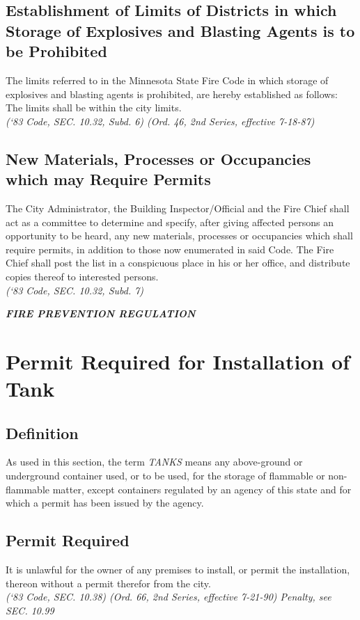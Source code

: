 \subsection{Establishment of Limits of Districts in which Storage of Explosives and Blasting Agents is to be Prohibited}
The limits referred to in the Minnesota State Fire Code in which storage of explosives and blasting agents is prohibited, are hereby established as follows: The limits shall be within the city limits.\\
\emph{(‘83 Code, SEC. 10.32, Subd. 6)  (Ord. 46, 2nd Series, effective 7-18-87)}
\subsection{New Materials, Processes or Occupancies which may Require Permits}
The City Administrator, the Building Inspector/Official and the Fire Chief shall act as a committee to determine and specify, after giving affected persons an opportunity to be heard, any new materials, processes or occupancies which shall require permits, in addition to those now enumerated in said Code. The Fire Chief shall post the list in a conspicuous place in his or her office, and distribute copies thereof to interested persons.\\
\emph{(‘83 Code, SEC. 10.32, Subd. 7)}

\begin{center}
\emph{\textbf{\LARGE{FIRE PREVENTION REGULATION}}}
\end{center}

\setcounter{section}{14}
\section{Permit Required for Installation of Tank}
\subsection{Definition}
As used in this section, the term \emph{TANKS} means any above-ground or underground container used, or to be used, for the storage of flammable or non-flammable matter, except containers regulated by an agency of this state and for which a permit has been issued by the agency.
\subsection{Permit Required}
It is unlawful for the owner of any premises to install, or permit the installation, thereon without a permit therefor from the city.\\
\emph{(‘83 Code, SEC. 10.38)  (Ord. 66, 2nd Series, effective 7-21-90)  Penalty, see SEC. 10.99}

